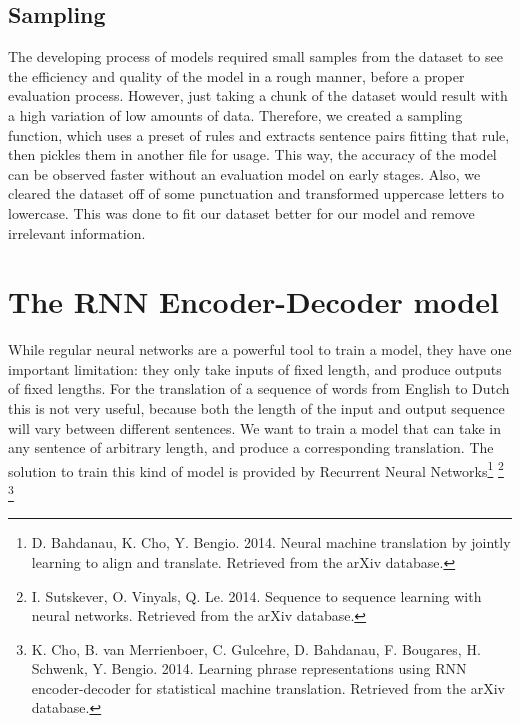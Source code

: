 \documentclass[11pt]{article}
\begin{document}
\subsection{Sampling}
The developing process of models required small samples from the dataset to see the efficiency and quality of the model in a rough manner, before a proper evaluation process. However, just taking a chunk of the dataset would result with a high variation of low amounts of data. Therefore, we created a sampling function, which uses a preset of rules and extracts sentence pairs fitting that rule, then pickles them in another file for usage. This way, the accuracy of the model can be observed faster without an evaluation model on early stages. Also, we cleared the dataset off of some punctuation and transformed uppercase letters to lowercase. This was done to fit our dataset better for our model and remove irrelevant information.

\section{The RNN Encoder-Decoder model}
While regular neural networks are a powerful tool to train a model, they have one important limitation: they only take inputs of fixed length, and produce outputs of fixed lengths. For the translation of a sequence of words from English to Dutch this is not very useful, because both the length of the input and output sequence will vary between different sentences. We want to train a model that can take in any sentence of arbitrary length, and produce a corresponding translation. The solution to train this kind of model is provided by Recurrent Neural Networks\footnote[3]{D. Bahdanau, K. Cho, Y. Bengio. 2014. Neural machine translation by jointly learning to align and translate. Retrieved from the arXiv database.} \footnote[4]{ I. Sutskever, O. Vinyals, Q. Le. 2014. Sequence to sequence learning with neural networks. Retrieved from the arXiv database.} \footnote[5]{K. Cho, B. van Merrienboer, C. Gulcehre, D. Bahdanau, F. Bougares, H. Schwenk, Y. Bengio. 2014. Learning phrase representations using RNN encoder-decoder for statistical machine translation. Retrieved from the arXiv database.}
\end{document}
